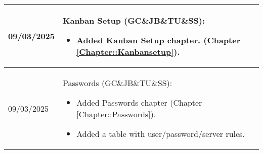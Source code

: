 \begin{longtable}{|l||p{13.5cm}|}
09/03/2025 & Kanban Setup (GC\&JB\&TU\&SS):
\begin{itemize}[topsep=0pt,itemsep=0pt,parsep=0pt,partopsep=0pt,leftmargin=12pt]
\item Added Kanban Setup chapter.
(Chapter \ref{Chapter::Kanbansetup}).
\end{itemize} 
\\ \hline

09/03/2025 & Passwords (GC\&JB\&TU\&SS):
\begin{itemize}[topsep=0pt,itemsep=0pt,parsep=0pt,partopsep=0pt,leftmargin=12pt]
\item Added Passwords chapter
(Chapter \ref{Chapter::Passwords}).
\item Added a table with user/password/server rules. 
\end{itemize} 
\\ \hline

\end{longtable}
